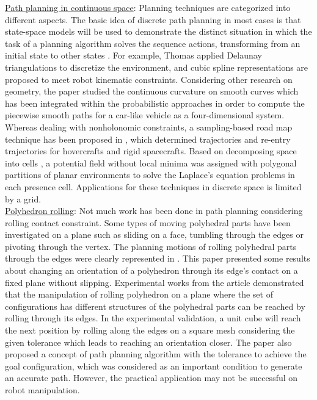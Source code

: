 \noindent \uline{Path planning in continuous space}:
Planning techniques are categorized into different aspects. 
The basic idea of discrete path planning in most cases is that state-space models will be used to demonstrate the distinct situation in which the task of a planning algorithm solves the sequence actions, transforming from an initial state to other states \cite{Lavalle98rapidly_exploringrandom}. 
For example, Thomas \cite{Thomas_2003_Trajectory} applied Delaunay triangulations to discretize the environment, and cubic spline representations are proposed to meet robot kinematic constraints.
Considering other research on geometry, the paper \cite{Lamiraux_2001_Smooth_MP} studied the continuous curvature on smooth curves which has been integrated within the probabilistic approaches in order to compute the piecewise smooth paths for a car-like vehicle as a four-dimensional system. 
Whereas dealing with nonholonomic constraints, a sampling-based road map technique has been proposed in \cite{Cheng01_RRT-BasedTrajectory}, which determined trajectories and re-entry trajectories for hovercrafts and rigid spacecrafts. 
Based on decomposing space into cells \cite{Conner03_LocalFunction_Nagivation}, a potential field without local minima was assigned with polygonal partitions of planar environments to solve the Laplace’s equation problems in each presence cell. 
Applications for these techniques in discrete space is limited by a grid.\\

\noindent \uline{Polyhedron rolling}:
Not much work has been done in path planning considering rolling contact constraint. Some types of moving polyhedral parts have been investigated on a plane such as sliding on a face, tumbling through the edges or pivoting \cite{Aiyama93_Pivoting} through the vertex. 
The planning motions of rolling polyhedral parts through the edges were clearly represented in \cite{Marigo97_PolyhedraManipulation_rolling}. 
This paper presented some results about changing an orientation of a polyhedron through its edge's contact on a fixed plane without slipping.
Experimental works from the article demonstrated that the manipulation of rolling polyhedron on a plane where the set of configurations has different structures of the polyhedral parts can be reached by rolling through its edges. 
In the experimental validation, a unit cube will reach the next position by rolling  along the edges on a square mesh considering the given tolerance which leads to reaching an orientation closer. 
The paper also proposed a concept of path planning algorithm with the tolerance to achieve the goal configuration, which was considered as an important condition to generate an accurate path.
However, the practical application may not be successful on robot manipulation.\\

